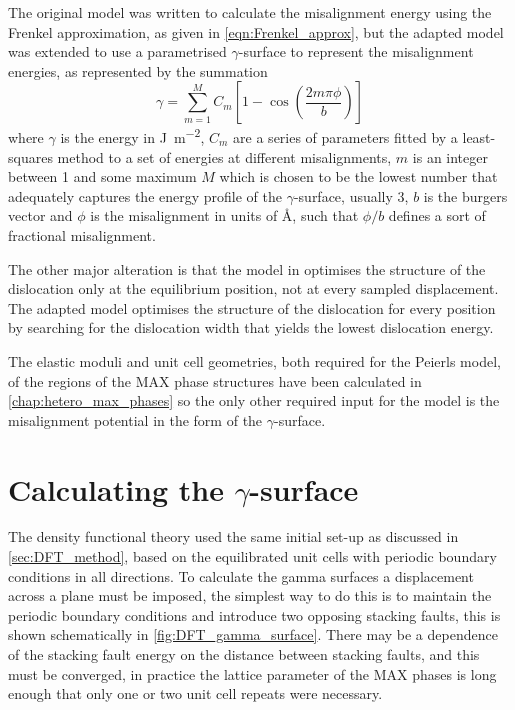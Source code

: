 The original model was written to calculate the misalignment energy using the Frenkel approximation, as given in \autoref{eqn:Frenkel_approx}, but the adapted model was extended to use a parametrised $\gamma$-surface to represent the misalignment energies, as represented by the summation
\begin{equation}
\gamma = \sum_{m=1}^{M} C_m \left[ 1 - \cos \left( \frac{2m\pi \phi}{b} \right) \right]\label{eqn:gamma_surface}
\end{equation}
where $\gamma$ is the energy in \si{\joule\per\meter\squared}, $C_m$ are a series of parameters fitted by a least-squares method to a set of energies at different misalignments, $m$ is an integer between 1 and some maximum $M$ which is chosen to be the lowest number that adequately captures the energy profile of the $\gamma$-surface, usually 3, $b$ is the burgers vector and $\phi$ is the misalignment in units of \si{\angstrom}, such that $\phi/b$ defines a sort of fractional misalignment.

The other major alteration is that the model in \cite{Clegg2006} optimises the structure of the dislocation only at the equilibrium position, not at every sampled displacement. The adapted model optimises the structure of the dislocation for every position by searching for the dislocation width that yields the lowest dislocation energy.


The elastic moduli and unit cell geometries, both required for the Peierls model, of the regions of the MAX phase structures have been calculated in \autoref{chap:hetero_max_phases} so the only other required input for the model is the misalignment potential in the form of the $\gamma$-surface.

\section{Calculating the \texorpdfstring{$\gamma$}{gamma}-surface}


The density functional theory used the same initial set-up as discussed in \autoref{sec:DFT_method}, based on the equilibrated unit cells with periodic boundary conditions in all directions. To calculate the gamma surfaces a displacement across a plane must be imposed, the simplest way to do this is to maintain the periodic boundary conditions and introduce two opposing stacking faults, this is shown schematically in \autoref{fig:DFT_gamma_surface}. There may be a dependence of the stacking fault energy on the distance between stacking faults, and this must be converged, in practice the lattice parameter of the MAX phases is long enough that only one or two unit cell repeats were necessary.

